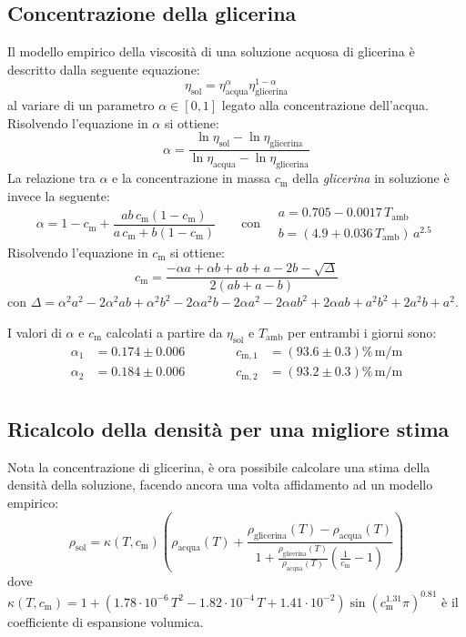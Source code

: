 \documentclass{article}
\begin{document}
\subsection{Concentrazione della glicerina}

Il modello empirico della viscosità di una soluzione acquosa di
glicerina è descritto dalla seguente equazione:
\[
  \eta_\text{sol} =
    \eta_\text{acqua}^\alpha \eta_\text{glicerina}^{1-\alpha}
\]
al variare di un parametro $\alpha\in[0,1]$ legato alla
concentrazione dell'acqua. Risolvendo l'equazione in $\alpha$ si
ottiene:
\[
  \alpha = \frac{\ln{\eta_\text{sol}} - \ln{\eta_\text{glicerina}}}
    {\ln{\eta_\text{acqua}} - \ln{\eta_\text{glicerina}}}
\]
La relazione tra $\alpha$ e la concentrazione in massa $c_\text{m}$
della \emph{glicerina} in soluzione è invece la seguente:
\[
  \alpha = 1 - c_\text{m} + \frac{a b\,c_\text{m} (1 - c_\text{m})}
    {a\,c_\text{m} + b (1 - c_\text{m})}
  \qquad\text{con}\quad
  \begin{array}{l}
    a = 0.705 - 0.0017\,T_\text{amb} \\
    b = (4.9 + 0.036\,T_\text{amb})\,a^{2.5}
  \end{array}
\]
Risolvendo l'equazione in $c_\text{m}$ si ottiene:
\[
  c_\text{m} = \frac{
    -\alpha a + \alpha b + ab + a - 2b - \sqrt{\Delta}}{2(ab + a - b)}
\]
con $
\Delta = \alpha^2 a^2 - 2\alpha^2 ab + \alpha^2 b^2 - 2\alpha a^2 b -
2\alpha a^2 - 2\alpha a b^2 + 2\alpha ab + a^2 b^2 + 2a^2 b + a^2$.

\vspace{2mm}
I valori di $\alpha$ e $c_\text{m}$ calcolati a partire da $\eta_\text{sol}$ e
$T_\text{amb}$ per entrambi i giorni sono:
\[
\begin{aligned}
  \alpha_1 &= 0.174\pm0.006
  \qquad\qquad
  c_{\text{m},1} &= (93.6\pm0.3)\%\,\text{m}/\text{m}\\
  \alpha_2 &= 0.184\pm0.006
  \qquad\qquad
  c_{\text{m},2} &= (93.2\pm0.3)\%\,\text{m}/\text{m}\\
\end{aligned}
\]

\subsection{Ricalcolo della densità per una migliore stima}
Nota la concentrazione di glicerina, è ora possibile
calcolare una stima della densità della soluzione, facendo
ancora una volta affidamento ad un modello empirico:
\[
  \rho_\text{sol} = \kappa(T,c_\text{m}) \left(
  \rho_\text{acqua}(T) + \frac{
    \rho_\text{glicerina}(T) - \rho_\text{acqua}(T)
  }{1 + \frac{\rho_\text{glicerina}(T)}{\rho_\text{acqua}(T)}
    \!\left(\frac{1}{c_\text{m}} - 1\right)}
  \right)
\]
dove $
  \kappa(T,c_\text{m}) = 1 + \left(
    1.78\cdot10^{-6}\,T^2 - 1.82\cdot10^{-4}\,T + 1.41\cdot10^{-2}
  \right)\sin{\!\left(c_\text{m}^{1.31} \pi\right)}^{0.81}
$ è il coefficiente di espansione volumica.
\end{document}

